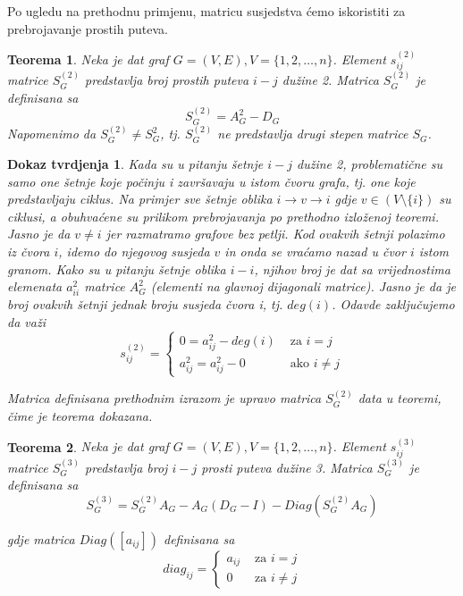 \documentclass[11pt]{article}
\newtheorem{theorem}{Teorema}
\newtheorem*{custom_proof}{Dokaz tvrdjenja}
\begin{document}
			Po ugledu na prethodnu primjenu, matricu susjedstva ćemo iskoristiti za prebrojavanje prostih puteva.
	
			\begin{theorem}
			Neka je dat graf $G = (V, E), V = \{1, 2, \dots, n\}$. Element $s_{ij}^{(2)}$ matrice $S_G^{(2)}$ predstavlja broj prostih puteva $i-j$ dužine 2. Matrica $S_G^{(2)}$ je definisana sa
			\[
			S_G^{(2)} = A_G^{2} - D_G
			\]  
			Napomenimo da $S_G^{(2)} \neq S_G^{2}$, tj. $S_G^{(2)}$ ne predstavlja drugi stepen matrice $S_G$.
			\end{theorem}
		
			\begin{custom_proof}
			Kada su u pitanju šetnje $i-j$ dužine 2, problematične su samo one šetnje koje počinju i završavaju u istom čvoru grafa, tj. one koje predstavljaju ciklus. 
		 	Na primjer sve šetnje oblika $i \rightarrow v \rightarrow i$ gdje $v \in (V \setminus \{i\})$ su ciklusi, a obuhvaćene su prilikom prebrojavanja po prethodno izloženoj teoremi.
			Jasno je da $v \neq i$ jer razmatramo grafove bez petlji. 
			Kod ovakvih šetnji polazimo iz čvora $i$, idemo do njegovog susjeda $v$ in onda se vraćamo nazad u čvor $i$ istom granom.
			Kako su u pitanju šetnje oblika $i-i$, njihov broj je dat sa vrijednostima elemenata $a_{ii}^2$ matrice $A_G^2$ (elementi na glavnoj dijagonali matrice). 
			Jasno je da je broj ovakvih šetnji jednak broju susjeda čvora i, tj. $deg(i)$. Odavde zaključujemo da važi
				\[
				s_{ij}^{(2)} = 
				 \begin{cases}
				 0 = a_{ij}^2 - deg(i) &  \text{ za } i = j  \\ 
				 a_{ij}^2 = a_{ij}^2 - 0   & \text{ ako } i \neq j 
				 \end{cases}
				\]  
		
			Matrica definisana prethodnim izrazom je upravo matrica $S_G^{(2)}$ data u teoremi, čime je teorema dokazana.
			\end{custom_proof}
	
			\begin{theorem}
			Neka je dat graf $G = (V, E), V = \{1, 2, \dots, n\}$. Element $s_{ij}^{(3)}$ matrice $S_G^{(3)}$ predstavlja broj $i-j$ prosti puteva dužine 3. Matrica $S_G^{(3)}$ je definisana sa
			\[
			S_G^{(3)} = S_G^{(2)} A_G - A_G (D_G - I) - Diag(S_G^{(2)} A_G) 
			\]  

			gdje matrica $Diag([a_{ij}])$ definisana sa
			\[
			diag_{ij} = 
			 \begin{cases}
				a_{ij} &  \text{ za } i = j  \\ 
			 	0   & \text{ za } i \neq j 
			 \end{cases}
			\]
			\end{theorem}
	
\end{document}
